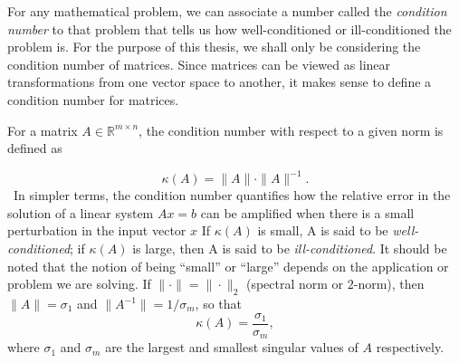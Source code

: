 For any mathematical problem, we can associate a number called the \textit{condition number} to that problem that tells us how well-conditioned or ill-conditioned the problem is. For the purpose of this thesis, we shall only be considering the condition number of matrices. Since matrices can be viewed as linear transformations from one vector space to another, it makes sense to define a condition number for matrices.

For a matrix $A \in \mathbb{R}^{m\times n}$, the condition number with respect to a given norm is defined as

\[\kappa(A) = \|A\| \cdot \|A\|^{-1}.\]\
In simpler terms, the condition number quantifies how the relative error in the solution of a linear system $Ax = b$ can be amplified when there is a small perturbation in the input vector $x$ If $\kappa(A)$ is small, A is said to be \textit{well-conditioned}; if $\kappa(A)$ is large, then A is said to be \textit{ill-conditioned}. It should be noted that the notion of being ``small'' or ``large'' depends on the application or problem we are solving. If $\| \cdot\| = \| \cdot \|_2$ (spectral norm or $2$-norm), then $\|A\| = \sigma_1$ and $\| A^{-1} \| = 1/\sigma_m$, so that
\begin{equation}\label{eq:ConditionNumber}
	\kappa(A) = \frac{\sigma_1}{\sigma_m},
\end{equation}
where $\sigma_1$ and $\sigma_m$ are the largest and smallest singular values of $A$ respectively.

